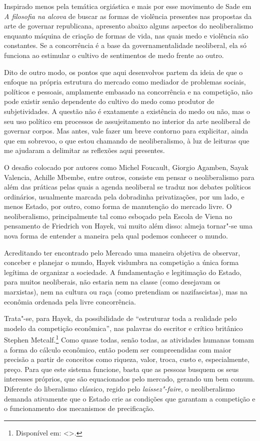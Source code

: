 \asterisc

Inspirado menos pela temática orgiástica e mais por esse movimento de
Sade em \emph{A filosofia na alcova} de buscar as formas de violência
presentes nas propostas da arte de governar republicana, apresento
abaixo alguns aspectos do neoliberalismo enquanto máquina de criação de
formas de vida, nas quais medo e violência são constantes. Se a
concorrência é a base da governamentalidade neoliberal, ela só funciona
ao estimular o cultivo de sentimentos de medo frente ao outro.

Dito de outro modo, os pontos que aqui desenvolvos partem da ideia de
que o enfoque na própria estrutura do mercado como mediador de problemas
sociais, políticos e pessoais, amplamente embasado na concorrência e na
competição, não pode existir senão dependente do cultivo do medo como
produtor de subjetividades. A questão não é exatamente a existência do
medo ou não, mas o seu uso político em processos de assujeitamento no
interior da arte neoliberal de governar corpos. Mas antes, vale fazer um
breve contorno para explicitar, ainda que em sobrevoo, o que estou
chamando de neoliberalismo, à luz de leituras que me ajudaram a
delimitar as reflexões aqui presentes.

\asterisc

O desafio colocado por autores como Michel Foucault, Giorgio Agamben,
Sayak Valencia, Achille Mbembe, entre outros, consiste em pensar o
neoliberalismo para além das práticas pelas quais a agenda neoliberal se
traduz nos debates políticos ordinários, usualmente marcada pela
dobradinha privatizações, por um lado, e menos Estado, por outro, como
forma de manutenção do mercado livre. O neoliberalismo, principalmente
tal como esboçado pela Escola de Viena no pensamento de Friedrich von
Hayek, vai muito além disso: almeja tornar"-se uma nova forma de entender
a maneira pela qual podemos conhecer o mundo.

Acreditando ter encontrado pelo Mercado uma maneira objetiva de
observar, conceber e planejar o mundo, Hayek vislumbra na competição a
única forma legítima de organizar a sociedade. A fundamentação e
legitimação do Estado, para muitos neoliberais, não estaria nem na
classe (como desejavam os marxistas), nem na cultura ou raça (como
pretendiam os nazifascistas), mas na econômia ordenada pela livre
concorrência.

Trata"-se, para Hayek, da possibilidade de ``estruturar toda a realidade
pelo modelo da competição econômica'', nas palavras do escritor e
crítico britânico Stephen Metcalf.\footnote{Disponível em: \textless{}{}\textgreater{}.}
Como quase todas, senão todas, as atividades humanas tomam a forma do
cálculo econômico, então podem ser compreendidas com maior precisão a
partir de conceitos como riqueza, valor, troca, custo e, especialmente,
preço. Para que este sistema funcione, basta que as pessoas busquem os
seus interesses próprios, que são equacionados pelo mercado, gerando um
bem comum. Diferente do liberalismo clássico, regido pelo \emph{laissez"-faire},
o neoliberalismo demanda ativamente que o Estado crie as condições que
garantam a competição e o funcionamento dos mecanismos de precificação.

